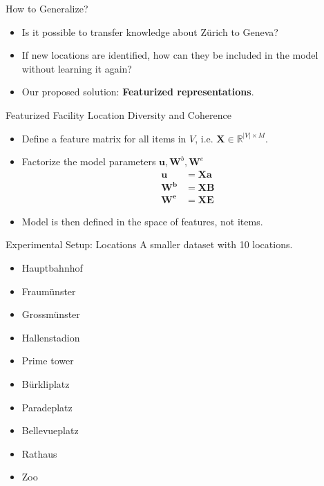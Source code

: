 \documentclass{beamer}
\begin{document}
\begin{frame}{How to Generalize?}
  \begin{itemize}
    \item Is it possible to transfer knowledge about Zürich to Geneva?
    \item If new locations are identified, how can they be included in the model without learning it again?
    \item Our proposed solution: \textbf{Featurized representations}.
  \end{itemize}
\end{frame}

\begin{frame}{Featurized Facility Location Diversity and Coherence}
  \begin{itemize}
    \item Define a feature matrix for all items in $V$, i.e. $\mathbf{X} \in \mathbb{R}^{|V| \times M}$.
    \item Factorize the model parameters $\mathbf{u}, \mathbf{W}^{b}, \mathbf{W}^{e}$
      \begin{align*}
        \mathbf{u} &= \mathbf{X}\mathbf{a} \\
        \mathbf{W^{b}} &= \mathbf{X}\mathbf{B} \\
        \mathbf{W^{e}} &= \mathbf{X}\mathbf{E}
      \end{align*}
    \item Model is then defined in the space of features, not items.
  \end{itemize}
\end{frame}

\begin{frame}{Experimental Setup: Locations}
  A smaller dataset with 10 locations.
  \begin{itemize}
    \item Hauptbahnhof
    \item Fraumünster
    \item Grossmünster
    \item Hallenstadion
    \item Prime tower
    \item Bürkliplatz
    \item Paradeplatz
    \item Bellevueplatz
    \item Rathaus
    \item Zoo
  \end{itemize}
\end{frame}
\end{document}
